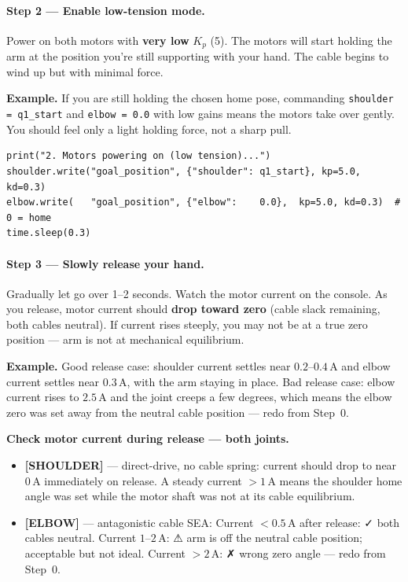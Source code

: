 \documentclass[11pt,a4paper]{article}
\begin{document}
\paragraph{Step 2 --- Enable low-tension mode.}
Power on both motors with \textbf{very low} $K_p$ (5).  The motors will start holding
the arm at the position you're still supporting with your hand.
The cable begins to wind up but with minimal force.

\textbf{Example.}
If you are still holding the chosen home pose, commanding
\texttt{shoulder = q1\_start} and \texttt{elbow = 0.0} with low gains means the motors
take over gently.  You should feel only a light holding force, not a sharp pull.
\begin{lstlisting}[caption={Motors take over with low tension.}]
print("2. Motors powering on (low tension)...")
shoulder.write("goal_position", {"shoulder": q1_start}, kp=5.0, kd=0.3)
elbow.write(   "goal_position", {"elbow":    0.0},  kp=5.0, kd=0.3)  # 0 = home
time.sleep(0.3)
\end{lstlisting}

\paragraph{Step 3 --- Slowly release your hand.}
Gradually let go over 1--2 seconds.  Watch the motor current on the console.
As you release, motor current should \textbf{drop toward zero} (cable slack remaining,
both cables neutral).  If current rises steeply, you may not be at a true zero position
--- arm is not at mechanical equilibrium.

\textbf{Example.}
Good release case: shoulder current settles near $0.2$--$0.4$\,A and elbow current settles
near $0.3$\,A, with the arm staying in place.
Bad release case: elbow current rises to $2.5$\,A and the joint creeps a few degrees,
which means the elbow zero was set away from the neutral cable position --- redo from Step~0.

\begin{warnbox}
  \textbf{Check motor current during release --- both joints.}
  
  \begin{itemize}[leftmargin=2em]
    \item \textcolor{blue!70!black}{\textbf{[SHOULDER]}} --- direct-drive, no cable spring:
      current should drop to near $0$\,A immediately on release.
      A steady current $>1$\,A means the shoulder home angle was set while
      the motor shaft was not at its cable equilibrium.
    \item \textcolor{green!50!black}{\textbf{[ELBOW]}} --- antagonistic cable SEA:\newline
      Current $< 0.5$\,A after release: ✓ both cables neutral.\newline
      Current $1$--$2$\,A: ⚠ arm is off the neutral cable position; acceptable but not ideal.\newline
      Current $> 2$\,A: ✗ wrong zero angle --- redo from Step~0.
  \end{itemize}
\end{warnbox}
\end{document}
